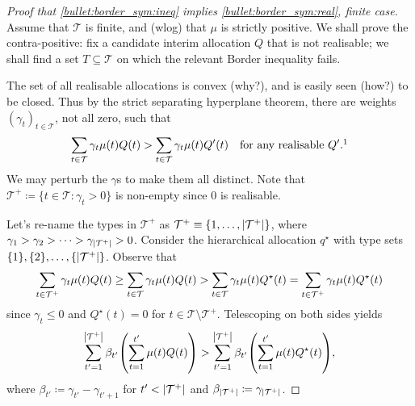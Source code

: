 \begin{proof}[Proof that \ref{bullet:border_sym:ineq} implies \ref{bullet:border_sym:real}, finite case]
	Assume that $\mathcal{T}$ is finite, and (wlog) that $\mu$ is strictly positive.
	We shall prove the contra-positive:
	fix a candidate interim allocation $Q$ that is not realisable;
	we shall find a set $T \subseteq \mathcal{T}$ on which the relevant Border inequality fails.

	The set of all realisable allocations is convex (why?),
	and is easily seen (how?) to be closed.
	Thus by the strict separating hyperplane theorem,
	there are weights $(\gamma_t)_{t \in \mathcal{T}}$, not all zero, such that
	\begin{equation*}
		\sum_{t \in \mathcal{T}} \gamma_t \mu(t) Q(t)
		> \sum_{t \in \mathcal{T}} \gamma_t \mu(t) Q'(t)
		\quad \text{for any realisable $Q'$.}\footnotemark
	\end{equation*}%
	We may perturb the $\gamma$s to make them all distinct.
	Note that $\mathcal{T}^+ \coloneqq \{ t \in \mathcal{T} : \gamma_t > 0 \}$ is non-empty since $0$ is realisable.


	Let's re-name the types in $\mathcal{T}^+$ as $\mathcal{T}^+ \equiv \{1,\dots,\abs*{\mathcal{T}^+}\}$, where
	$\gamma_1 > \gamma_2 > \cdots > \gamma_{\abs*{\mathcal{T}^+}} > 0$.
	Consider the hierarchical allocation $q^\star$
	with type sets $\{1\},\{2\}, \dots, \{\abs*{\mathcal{T}^+}\}$.
	Observe that
	\begin{equation*}
		\sum_{t \in \mathcal{T}^+} \gamma_t \mu(t) Q(t)
		\geq \sum_{t \in \mathcal{T}} \gamma_t \mu(t) Q(t)
		> \sum_{t \in \mathcal{T}} \gamma_t \mu(t) Q^\star(t)
		\\
		= \sum_{t \in \mathcal{T}^+} \gamma_t \mu(t) Q^\star(t) 
	\end{equation*}
	since $\gamma_t \leq 0$ and $Q^\star(t)=0$ for $t \in \mathcal{T} \setminus \mathcal{T}^+$.
	Telescoping on both sides yields
	\begin{equation*}
		\sum_{t'=1}^{\abs*{\mathcal{T}^+}}
		\beta_{t'}
		\left( \sum_{t=1}^{t'} \mu(t) Q(t) \right)
		> \sum_{t'=1}^{\abs*{\mathcal{T}^+}}
		\beta_{t'}
		\left( \sum_{t=1}^{t'} \mu(t) Q^\star(t) \right) ,
	\end{equation*}
	where $\beta_{t'} \coloneqq \gamma_{t'}-\gamma_{t'+1}$ for $t' < \abs*{\mathcal{T}^+}$ and $\beta_{\abs*{\mathcal{T}^+}} \coloneqq \gamma_{\abs*{\mathcal{T}^+}}$.


\end{proof}
